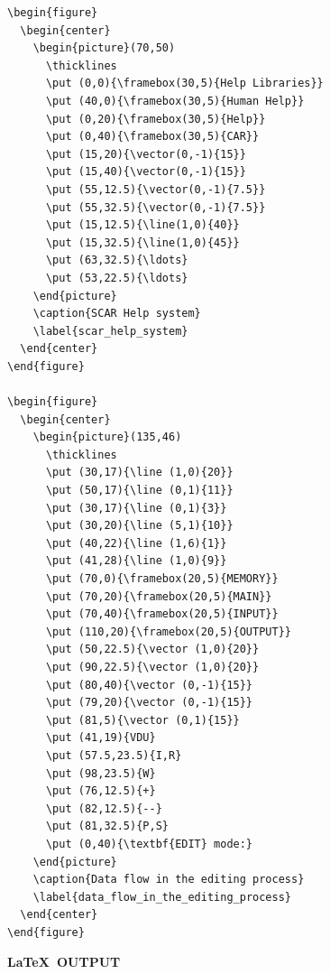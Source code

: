 \documentclass[twoside,11pt]{article}
\begin{document}
\begin{verbatim}
\begin{figure}
  \begin{center}
    \begin{picture}(70,50)
      \thicklines
      \put (0,0){\framebox(30,5){Help Libraries}}
      \put (40,0){\framebox(30,5){Human Help}}
      \put (0,20){\framebox(30,5){Help}}
      \put (0,40){\framebox(30,5){CAR}}
      \put (15,20){\vector(0,-1){15}}
      \put (15,40){\vector(0,-1){15}}
      \put (55,12.5){\vector(0,-1){7.5}}
      \put (55,32.5){\vector(0,-1){7.5}}
      \put (15,12.5){\line(1,0){40}}
      \put (15,32.5){\line(1,0){45}}
      \put (63,32.5){\ldots}
      \put (53,22.5){\ldots}
    \end{picture}
    \caption{SCAR Help system}
    \label{scar_help_system}
  \end{center}
\end{figure}

\begin{figure}
  \begin{center}
    \begin{picture}(135,46)
      \thicklines
      \put (30,17){\line (1,0){20}}
      \put (50,17){\line (0,1){11}}
      \put (30,17){\line (0,1){3}}
      \put (30,20){\line (5,1){10}}
      \put (40,22){\line (1,6){1}}
      \put (41,28){\line (1,0){9}}
      \put (70,0){\framebox(20,5){MEMORY}}
      \put (70,20){\framebox(20,5){MAIN}}
      \put (70,40){\framebox(20,5){INPUT}}
      \put (110,20){\framebox(20,5){OUTPUT}}
      \put (50,22.5){\vector (1,0){20}}
      \put (90,22.5){\vector (1,0){20}}
      \put (80,40){\vector (0,-1){15}}
      \put (79,20){\vector (0,-1){15}}
      \put (81,5){\vector (0,1){15}}
      \put (41,19){VDU}
      \put (57.5,23.5){I,R}
      \put (98,23.5){W}
      \put (76,12.5){+}
      \put (82,12.5){--}
      \put (81,32.5){P,S}
      \put (0,40){\textbf{EDIT} mode:}
    \end{picture}
    \caption{Data flow in the editing process}
    \label{data_flow_in_the_editing_process}
  \end{center}
\end{figure}
\end{verbatim}

\normalsize

\newpage

\begin{center}
  \textbf{\LaTeX\ OUTPUT}
\end{center}
\end{document}
